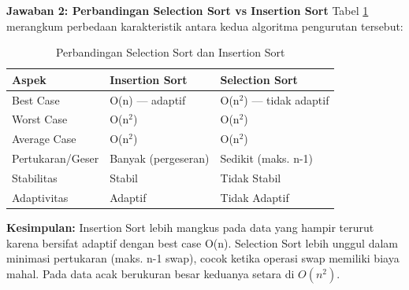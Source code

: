 \textbf{Jawaban 2: Perbandingan Selection Sort vs Insertion Sort}
Tabel \ref{tab:komparasi_sort} merangkum perbedaan karakteristik antara kedua algoritma pengurutan tersebut:

\begin{table}[H]
    \centering
    \caption{Perbandingan Selection Sort dan Insertion Sort}
    \label{tab:komparasi_sort}
    \begin{tabular}{lll}
    \toprule
    \textbf{Aspek} & \textbf{Insertion Sort} & \textbf{Selection Sort} \\ \midrule
    Best Case & O(n) --- adaptif & O(n$^2$) --- tidak adaptif \\
    Worst Case & O(n$^2$) & O(n$^2$) \\
    Average Case & O(n$^2$) & O(n$^2$) \\
    Pertukaran/Geser & Banyak (pergeseran) & Sedikit (maks. n-1) \\
    Stabilitas & Stabil & Tidak Stabil \\
    Adaptivitas & Adaptif & Tidak Adaptif \\ \bottomrule
    \end{tabular}
\end{table}

\textbf{Kesimpulan:} Insertion Sort lebih mangkus pada data yang hampir terurut karena bersifat adaptif dengan best case O(n). Selection Sort lebih unggul dalam minimasi pertukaran (maks. n-1 swap), cocok ketika operasi swap memiliki biaya mahal. Pada data acak berukuran besar keduanya setara di $O(n^2)$.
